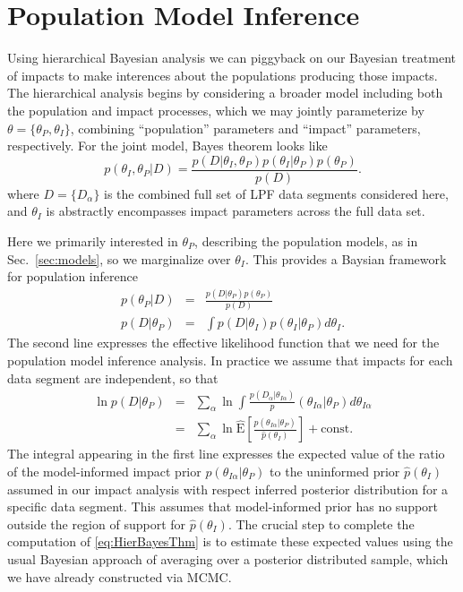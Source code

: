 \documentclass[twocolumn, trackchanges]{aastex61}
\begin{document}
\FloatBarrier
\section{Population Model Inference} \label{sec:model_inference}

Using hierarchical Bayesian analysis we can piggyback on our Bayesian treatment of impacts to make interences about the populations producing those impacts. The hierarchical analysis begins by considering a broader model including both the population and impact processes, which we may jointly parameterize by $\theta=\{\theta_P,\theta_I\}$, combining ``population'' parameters and ``impact'' parameters, respectively.  For the joint model, Bayes theorem looks like
\begin{equation}
  p(\theta_I,\theta_P|D)=\frac{p(D|\theta_I,\theta_P)p(\theta_I|\theta_P)p(\theta_P)}{p(D)}.
\end{equation}
where $D=\{D_\alpha\}$ is the combined full set of LPF data segments considered here, and $\theta_I$ is abstractly encompasses impact parameters across the full data set.

Here we primarily interested in $\theta_P$, describing the population models, as in Sec.~\ref{sec:models}, so we marginalize over $\theta_I$.  This provides a Baysian framework for population inference
\begin{eqnarray}
  p(\theta_P|D)&=&\frac{ p(D|\theta_P)p(\theta_P)}{p(D)}\label{eq:HierBayesThm}\\
  p(D|\theta_P)&=&\int p(D|\theta_I)p(\theta_I|\theta_P)d\theta_I\label{eq:metaLike}.
\end{eqnarray}
The second line expresses the effective likelihood function that we need for the population model inference analysis.
In practice we assume that impacts for each data segment are independent, so that
\begin{eqnarray}
  \ln {p(D|\theta_P)}&=&\sum_\alpha \ln\int \frac{p(D_\alpha|\theta_{I\alpha})}p(\theta_{I\alpha}|\theta_P)d\theta_{I\alpha}\\
  &=&\sum_\alpha \ln\hat{\mathrm{E}}\left[\frac{p(\theta_{I\alpha}|\theta_P)}{\hat p(\theta_I)}\right]+\mathrm{const}\label{eq:metaLikeSegmented}.
\end{eqnarray}
The integral appearing in the first line expresses the expected value of the ratio of the model-informed impact prior $p(\theta_{I\alpha}|\theta_P)$ to the uninformed prior $\hat p(\theta_{I})$ assumed in our impact analysis with respect inferred posterior distribution for a specific data segment.  This assumes that model-informed prior has no support outside the region of support for $\hat p(\theta_{I})$.
The crucial step to complete the computation of \eqref{eq:HierBayesThm} is to estimate these expected values using the usual Bayesian approach of averaging over a posterior distributed sample, which we have already constructed via MCMC.
\end{document}
